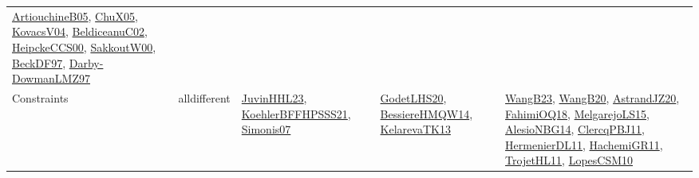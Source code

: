 {\begin{longtable}{lp{3cm}>{\raggedright}p{6cm}>{\raggedright}p{6cm}p{8cm}}
\href{papers/ArtiouchineB05.pdf}{ArtiouchineB05}\cite{ArtiouchineB05}, \href{papers/ChuX05.pdf}{ChuX05}\cite{ChuX05}, \href{papers/KovacsV04.pdf}{KovacsV04}\cite{KovacsV04}, \href{papers/BeldiceanuC02.pdf}{BeldiceanuC02}\cite{BeldiceanuC02}, \href{articles/HeipckeCCS00.pdf}{HeipckeCCS00}\cite{HeipckeCCS00}, \href{articles/SakkoutW00.pdf}{SakkoutW00}\cite{SakkoutW00}, \href{papers/BeckDF97.pdf}{BeckDF97}\cite{BeckDF97}, \href{articles/Darby-DowmanLMZ97.pdf}{Darby-DowmanLMZ97}\cite{Darby-DowmanLMZ97}\\
Constraints & alldifferent & \href{papers/JuvinHHL23.pdf}{JuvinHHL23}\cite{JuvinHHL23}, \href{articles/KoehlerBFFHPSSS21.pdf}{KoehlerBFFHPSSS21}\cite{KoehlerBFFHPSSS21}, \href{articles/Simonis07.pdf}{Simonis07}\cite{Simonis07} & \href{papers/GodetLHS20.pdf}{GodetLHS20}\cite{GodetLHS20}, \href{papers/BessiereHMQW14.pdf}{BessiereHMQW14}\cite{BessiereHMQW14}, \href{papers/KelarevaTK13.pdf}{KelarevaTK13}\cite{KelarevaTK13} & \href{papers/WangB23.pdf}{WangB23}\cite{WangB23}, \href{papers/WangB20.pdf}{WangB20}\cite{WangB20}, \href{articles/AstrandJZ20.pdf}{AstrandJZ20}\cite{AstrandJZ20}, \href{articles/FahimiOQ18.pdf}{FahimiOQ18}\cite{FahimiOQ18}, \href{papers/MelgarejoLS15.pdf}{MelgarejoLS15}\cite{MelgarejoLS15}, \href{papers/AlesioNBG14.pdf}{AlesioNBG14}\cite{AlesioNBG14}, \href{papers/ClercqPBJ11.pdf}{ClercqPBJ11}\cite{ClercqPBJ11}, \href{papers/HermenierDL11.pdf}{HermenierDL11}\cite{HermenierDL11}, \href{articles/HachemiGR11.pdf}{HachemiGR11}\cite{HachemiGR11}, \href{articles/TrojetHL11.pdf}{TrojetHL11}\cite{TrojetHL11}, \href{articles/LopesCSM10.pdf}{LopesCSM10}\cite{LopesCSM10}\\

\end{longtable}}
